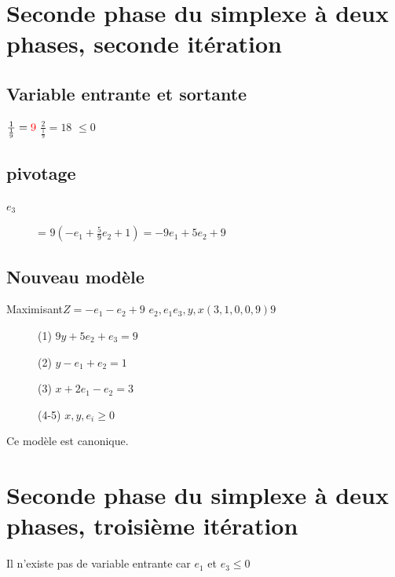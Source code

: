 \section{Seconde phase du simplexe à deux phases, seconde itération}
\subsection{Variable entrante et sortante}
  {$\frac{1}{\frac{1}{9}} = \textcolor{red}{9}$}
  {$\frac{2}{\frac{1}{9}} = 18$}
  {$ \leqslant 0$}
  
\subsection{pivotage}
\begin{description}
\item[$e_3$] = $9(-e_1 + \frac{5}{9}e_2 + 1) = -9e_1 + 5e_2 + 9$
\end{description}

\subsection{Nouveau modèle}
        {Maximisant}{$Z = -e_1 -e_2 + 9$}
        {$e_2,e_1$}{$e_3,y,x$}{$(3,1,0,0,9)$}{$9$}
        {\begin{description}
\item[] (1) $9y + 5e_2 + e_3 = 9$
\item[] (2) $y - e_1 + e_2 = 1$
\item[] (3) $x + 2e_1 - e_2 = 3$
\item[] (4-5) $x,y,e_i \geqslant 0$
\end{description}
}
Ce modèle est canonique.

\section{Seconde phase du simplexe à deux phases, troisième itération}
Il n'existe pas de variable entrante car $e_1$ et $e_3 \leqslant 0$
\pagebreak